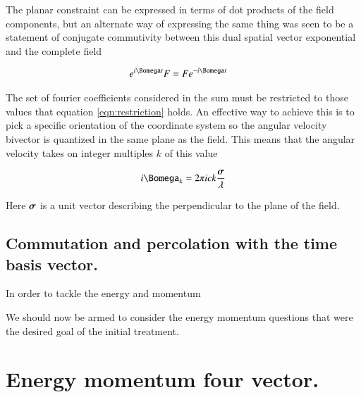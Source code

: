 \documentclass{article}
\begin{document}
The planar constraint can be expressed in terms of dot products of the field components, but an alternate way of expressing the same thing was seen to be
a statement of conjugate commutivity between this dual spatial vector exponential and the complete field

\begin{align}\label{eqn:restriction}
e^{ i \Bomega t} F &= F e^{ -i \Bomega t} 
\end{align}

The set of fourier coefficients considered in the sum must be restricted to those values that equation \ref{eqn:restriction} holds.  An effective 
way to achieve this is to 
pick a specific orientation of the coordinate system so the angular
velocity bivector is quantized in the same plane as the field.  This means that
the angular velocity takes on integer multiples $k$ of this value

\begin{align}
i \Bomega_k = 2 \pi i c k \frac{\Bsigma}{\lambda}
\end{align}

Here $\boldsymbol{\sigma}$ is a unit vector describing the perpendicular to the plane of the field.

\subsection{ Commutation and percolation with the time basis vector. }

In order to tackle the energy and momentum 

We should now be armed to consider the energy momentum questions that were the desired goal of the initial treatment.

\section{ Energy momentum four vector. }



\end{document}
